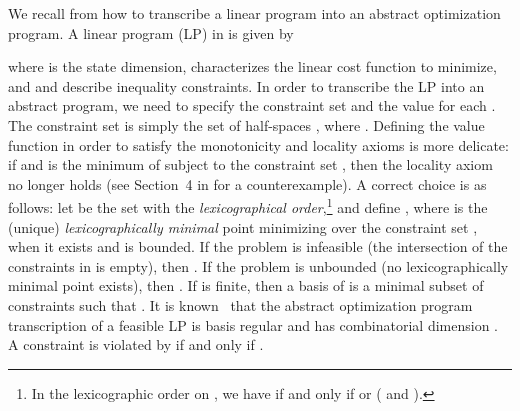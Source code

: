 \documentclass[onecolumn,journal,letterpaper]{IEEEtran}
\newcommand\oprocendsymbol{\hbox{}}
\newcommand\oprocend{\relax\ifmmode\else\unskip\hfill\fi\oprocendsymbol}
\begin{document}
\begin{example}
  \label{ex:abstract-framework-for-LP}
  We recall from \cite{BG-EW:96} how to transcribe a linear program into an
  abstract optimization program.  A linear program (LP) in 
  is given by
  
  where  is the state dimension,  characterizes
  the linear cost function to minimize, and  and  describe  inequality constraints.  In order to
  transcribe the LP into an abstract program, we need to specify the
  constraint set  and the value  for each . The
  constraint set  is simply the set of half-spaces , where .  Defining
  the value function in order to satisfy the monotonicity and locality
  axioms is more delicate: if  and  is the
  minimum of  subject to the constraint set , then the locality
  axiom no longer holds (see Section~4 in \cite{BG-EW:96} for a
  counterexample).  A correct choice is as follows: let  be
  the set  with the \emph{lexicographical order},\footnote{In the
    lexicographic order on , we have  if
    and only if  or ( and ).} and define
  , where  is the (unique)
  \emph{lexicographically minimal} point  minimizing  over the
  constraint set , when it exists and is bounded. If the problem is
  infeasible (the intersection of the constraints in  is empty), then
  .  If the problem is unbounded (no lexicographically
  minimal point exists), then .  If  is finite, then
  a basis of  is a minimal subset of constraints  such that
  .  It is known~\cite{JM-MS-EW:96} that the abstract
  optimization program transcription of a feasible LP is basis regular and
  has combinatorial dimension . A constraint  is violated by 
  if and only if .  \oprocend
\end{example}
\end{document}
